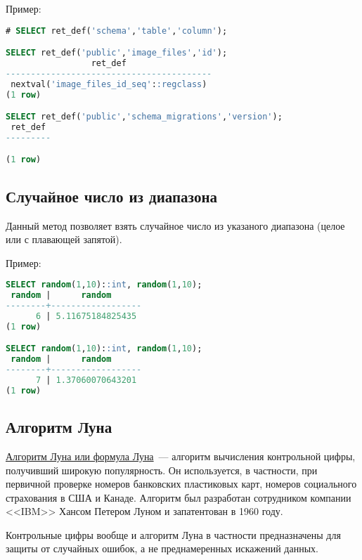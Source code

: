 

Пример:

\begin{lstlisting}[language=SQL,label=lst:snippets7,caption=Узнать значение по умолчанию у поля в таблице. Пример]
# SELECT ret_def('schema','table','column');

SELECT ret_def('public','image_files','id');
                 ret_def
-----------------------------------------
 nextval('image_files_id_seq'::regclass)
(1 row)

SELECT ret_def('public','schema_migrations','version');
 ret_def
---------

(1 row)
\end{lstlisting}

\subsection{Случайное число из диапазона}
Данный метод позволяет взять случайное число из указаного диапазона (целое или с плавающей запятой).



Пример:

\begin{lstlisting}[language=SQL,label=lst:snippets9,caption=Случайное число из диапазона. Пример]
SELECT random(1,10)::int, random(1,10);
 random |      random
--------+------------------
      6 | 5.11675184825435
(1 row)

SELECT random(1,10)::int, random(1,10);
 random |      random
--------+------------------
      7 | 1.37060070643201
(1 row)
\end{lstlisting}

\subsection{Алгоритм Луна}
\href{http://en.wikipedia.org/wiki/Luhn\_algorithm}{Алгоритм Луна или формула Луна}~--- алгоритм вычисления контрольной цифры, получивший широкую популярность. Он используется, в частности, при первичной проверке номеров банковских пластиковых карт, номеров социального страхования в США и Канаде. Алгоритм был разработан сотрудником компании <<IBM>> Хансом Петером Луном и запатентован в 1960 году.

Контрольные цифры вообще и алгоритм Луна в частности предназначены для защиты от случайных ошибок, а не преднамеренных искажений данных.


